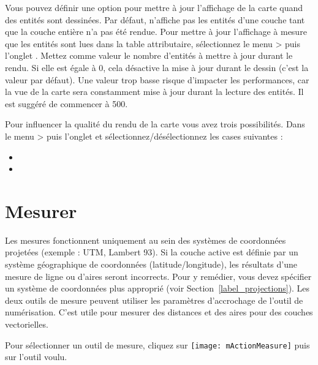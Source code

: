 Vous pouvez définir une option pour mettre à jour l'affichage de la carte quand des entités sont dessinées. Par défaut, \qg n'affiche pas les entités d'une couche tant que la couche entière n'a pas été rendue. Pour mettre à jour l'affichage à mesure que les entités sont lues dans la table attributaire, sélectionnez le menu  >  puis l'onglet . Mettez comme valeur le nombre d'entités à mettre à jour durant le rendu. Si elle est égale à 0, cela désactive la mise à jour durant le dessin (c'est la valeur par défaut). Une valeur trop basse risque d'impacter les performances, car la vue de la carte sera constamment mise à jour durant la lecture des entités. Il est suggéré de commencer à 500.

\label{label_renderquality} 

Pour influencer la qualité du rendu de la carte vous avez trois possibilités. Dans le menu  >  puis l'onglet  et sélectionnez/désélectionnez les cases suivantes :
\begin{itemize}[label=--]
\item {}
\item {}
\end{itemize}

\section{Mesurer} \label{sec:measure} 

Les mesures fonctionnent uniquement au sein des systèmes de coordonnées projetées (exemple : UTM, Lambert 93). Si la couche active est définie par un système géographique de coordonnées (latitude/longitude), les résultats d'une mesure de ligne ou d'aires seront incorrects. Pour y remédier, vous devez spécifier un système de coordonnées plus approprié (voir Section~\ref{label_projections}). Les deux outils de mesure peuvent utiliser les paramètres d'accrochage de l'outil de numérisation. C'est utile pour mesurer des distances et des aires pour des couches vectorielles.

Pour sélectionner un outil de mesure, cliquez sur \texttt{[image: mActionMeasure]} puis sur l'outil voulu.

